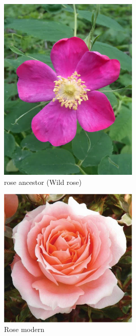 \documentclass[11pt,ignorenonframetext,aspectratio=169]{beamer}
\begin{document}
\begin{frame}{}
\protect\hypertarget{section-7}{}
\begin{figure}
\includegraphics[width=0.6\textwidth, keepaspectratio,height=0.45\textheight]{./images/rose_prickly_or_common} \caption{rose ancestor (Wild rose)}\label{fig:rose-wild}
\end{figure}

\begin{figure}
\includegraphics[width=0.6\textwidth, keepaspectratio,height=0.45\textheight]{./images/rose-modern} \caption{Rose modern}\label{fig:rose-modern}
\end{figure}
\end{frame}
\end{document}
